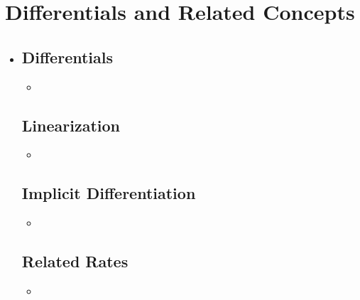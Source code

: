 \section{Differentials and Related Concepts}
\begin{itemize}
  \item []

  \subsection{Differentials}
  \begin{itemize}
    \item
  \end{itemize}

  \subsection{Linearization}
  \begin{itemize}
    \item
  \end{itemize}

  \subsection{Implicit Differentiation}
  \begin{itemize}
    \item
  \end{itemize}

  \subsection{Related Rates}
  \begin{itemize}
    \item
  \end{itemize}

\end{itemize}
